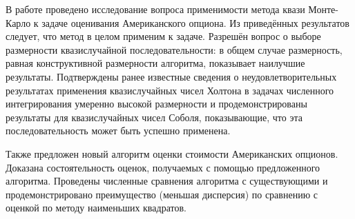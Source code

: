 \conclusion

В работе проведено исследование вопроса применимости метода квази Монте-Карло к задаче оценивания Американского опциона. Из приведённых результатов следует, что метод в целом применим к задаче. Разрешён вопрос о выборе размерности квазислучайной последовательности: в общем случае размерность, равная конструктивной размерности алгоритма, показывает наилучшие результаты. Подтверждены ранее известные сведения о неудовлетворительных результатах применения квазислучайных чисел Холтона в задачах численного интегрирования умеренно высокой размерности и продемонстрированы результаты для квазислучайных чисел Соболя, показывающие, что эта последовательность может быть успешно применена.

Также предложен новый алгоритм оценки стоимости Американских опционов. Доказана состоятельность оценок, получаемых с помощью предложенного алгоритма. Проведены численные сравнения алгоритма с существующими и продемонстрировано преимущество (меньшая дисперсия) по сравнению с оценкой по методу наименьших квадратов.